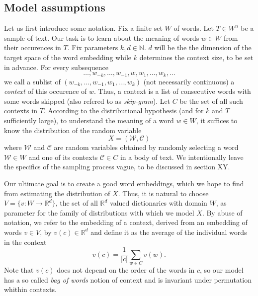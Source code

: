 \documentclass{amsart}
\theoremstyle{plain}
\theoremstyle{definition}
\newcommand{\R}{\mathbb{R}}
\newcommand{\N}{\mathbb{N}}
\begin{document}
\subsection{Model assumptions}
\label{subsec:model}
Let us first introduce some notation.
Fix a finite set $W$ of words.
Let $T \in W^n$ be a sample of text.
Our task is to learn about the meaning of words $w \in W$ from their occurences in $T$.
Fix parameters $k, d \in \N$.
$d$ will be the the dimension of the target space of the word embedding while $k$ determines the context size, to be set in advance.
For every subsequence
\begin{equation*}
  \dots, w_{-k}, \dots, w_{-1}, w, w_1, \dots, w_k, \dots
\end{equation*}
we call a sublist of $(w_{-k}, \dots, w_{-1}, w_1, \dots, w_k)$ (not necessarily continuous) a \emph{context} of this occurence of $w$.
Thus, a context is a list of consecutive words with some words skipped (also refered to as \emph{skip-gram}).
Let $C$ be the set of all such contexts in $T$.
According to the distributional hypothesis (and for $k$ and $T$ sufficiently large), to understand the meaning of a word $w \in W$, it suffices to know the distribution of the random variable
\begin{equation*}
  \label{eq:cond-expectation}
  X = (\mathcal{W}, \mathcal{C})
\end{equation*}
where $\mathcal{W}$ and $\mathcal{C}$ are random variables obtained by randomly selecting a word $\mathcal{W} \in W$ and one of its contexts $\mathcal{C} \in C$ in a body of text.
We intentionally leave the specifics of the sampling process vague, to be discussed in section XY.

Our ultimate goal is to create a good word embeddings, which we hope to find from estimating the distribution of $X$.
Thus, it is natural to choose $V = \{ v : W \rightarrow \R^d \}$, the set of all $\R^d$ valued dictionaries with domain $W$, as parameter for the family of distributions with which we model $X$.
By abuse of notation, we refer to the embedding of a context, derived from an embedding of words $v \in V$, by $v(c) \in \R^d$ and define it as the average of the individual words in the context
\begin{equation*}
  v(c) = \frac{1}{|c|} \sum_{w \in C} v(w).
\end{equation*}
Note that $v(c)$ does not depend on the order of the words in $c$, so our model has a so called \emph{bag of words} notion of context and is invariant under permutation whithin contexts.
\end{document}
